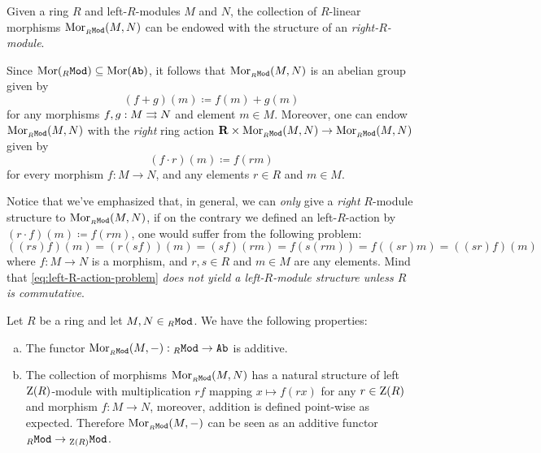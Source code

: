 \begin{example}
    \label{exp:R-mod-hom-set-is-module}
    Given a ring \(R\) and left-\(R\)-modules \(M\) and \(N\), the
    collection of \(R\)-linear morphisms \(\operatorname{Mor}_{{{}_{R}\texttt{Mod}}}(M, N)\) can be endowed
    with the structure of an \emph{right-\(R\)-module}.

    Since \(\operatorname{Mor}({{}_{R}\texttt{Mod}}) \subseteq \operatorname{Mor}({\texttt{Ab}})\), it follows that
    \(\operatorname{Mor}_{{{}_{R}\texttt{Mod}}}(M, N)\) is an abelian group given by
    \[
        (f + g)(m) \coloneq f(m) + g(m)
    \]
    for any morphisms \(f, g: M \rightrightarrows N\) and element \(m \in M\). Moreover, one can
    endow \(\operatorname{Mor}_{{{}_{R}\texttt{Mod}}}(M, N)\) with the \emph{right} ring action
    \(\mathbf{R} \times \operatorname{Mor}_{{{}_{R}\texttt{Mod}}}(M, N) \to \operatorname{Mor}_{{{}_{R}\texttt{Mod}}}(M, N)\) given by
    \[
        (f \cdot r)(m) \coloneq f(r m)
    \]
    for every morphism \(f: M \to N\), and any elements \(r \in R\) and \(m \in M\).

    Notice that we've emphasized that, in general, we can \emph{only} give a
    \emph{right} \(R\)-module structure to \(\operatorname{Mor}_{{{}_{R}\texttt{Mod}}}(M, N)\), if on the
    contrary we defined an left-\(R\)-action by \((r \cdot f)(m) \coloneq f(r m)\),
    one would suffer from the following problem:
    \begin{equation}\label{eq:left-R-action-problem}
        ((r s) f)(m) = (r(s f))(m) = (s f)(r m) = f(s (r m)) = f((s r) m) = ((s r) f)(m)
    \end{equation}
    where \(f: M \to N\) is a morphism, and \(r, s \in R\) and \(m \in M\) are any
    elements. Mind that \cref{eq:left-R-action-problem} \emph{does not yield a
        left-\(R\)-module structure unless \(R\) is commutative}.
\end{example}

\begin{lemma}
    \label{lem:hom-functor-is-additive}
    Let \(R\) be a ring and let \(M, N \in {{}_{R}\texttt{Mod}}\). We have the following
    properties:
    \begin{enumerate}[(a)]\setlength\itemsep{0em}
        \item The functor \(\operatorname{Mor}_{{{}_{R}\texttt{Mod}}}(M, -): {{}_{R}\texttt{Mod}} \to {\texttt{Ab}}\) is additive.

        \item The collection of morphisms \(\operatorname{Mor}_{{{}_{R}\texttt{Mod}}}(M, N)\) has a natural
              structure of left \(\operatorname{Z}(R)\)-module with multiplication \(r f\) mapping
              \(x \mapsto f(r x)\) for any \(r \in \operatorname{Z}(R)\) and morphism \(f: M \to N\), moreover,
              addition is defined point-wise as expected. Therefore
              \(\operatorname{Mor}_{{{}_{R}\texttt{Mod}}}(M, -)\) can be seen as an additive functor
              \({{}_{R}\texttt{Mod}} \to {{}_{\operatorname{Z}(R)}\texttt{Mod}}\).
    \end{enumerate}
\end{lemma}

